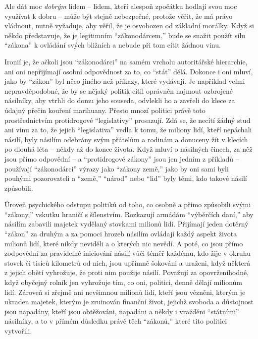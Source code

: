 \documentclass{book}
\begin{document}
Ale dát moc \emph{dobrým} lidem -- lidem, kteří alespoň zpočátku hodlají svou moc využívat k dobru -- může být stejně nebezpečné, protože věřit, že má právo vládnout, nutně vyžaduje, aby věřil, že je osvobozen od základní morálky. Když si někdo představuje, že je legitimním \enquote{zákonodárcem,} bude se snažit použít sílu \enquote{zákona} k ovládání svých bližních a nebude při tom cítit žádnou vinu.

Ironií je, že ačkoli jsou \enquote{zákonodárci} na samém vrcholu autoritářské hierarchie, ani oni nepřijímají osobní odpovědnost za to, co \enquote{stát} dělá. Dokonce i oni mluví, jako by \enquote{zákon} byl něco jiného než příkazy, které vydávají. Je například velmi nepravděpodobné, že by se nějaký politik cítil oprávněn najmout ozbrojené násilníky, aby vtrhli do domu jeho souseda, odvlekli ho a zavřeli do klece za údajný přečin kouření marihuany. Přesto mnozí politici právě toto prostřednictvím protidrogové \enquote{legislativy} prosazují. Zdá se, že necítí žádný stud ani vinu za to, že jejich \enquote{legislativa} vedla k tomu, že miliony lidí, kteří nepáchali násilí, byly násilím odebrány svým přátelům a rodinám a donuceny žít v klecích po dlouhá léta -- někdy až do konce života. Když mluví o násilných činech, za něž jsou přímo odpovědní -- a \enquote{protidrogové zákony} jsou jen jedním z příkladů -- používají \enquote{zákonodárci} výrazy jako \enquote{zákony země,} jako by oni sami byli pouhými pozorovateli a \enquote{země,} \enquote{národ} nebo \enquote{lid} byly těmi, kdo takové násilí způsobili.

Úroveň psychického odstupu politiků od toho, co osobně a přímo způsobili svými \enquote{zákony,} vskutku hraničí s šílenstvím. Rozkazují armádám \enquote{výběrčích daní,} aby násilím zabavili majetek vydělaný stovkami milionů lidí. Přijímají jeden dotěrný \enquote{zákon} za druhým a za pomoci hrozeb násilím ovládají každý aspekt života milionů lidí, které nikdy neviděli a o kterých nic nevědí. A poté, co jsou přímo zodpovědní za pravidelné iniciování násilí vůči téměř každému, kdo žije v okruhu stovek či tisíců kilometrů od nich, jsou upřímně šokováni a uraženi, když některá z jejich obětí vyhrožuje, že proti nim použije násilí. Považují za opovrženíhodné, když obyčejný rolník jen vyhrožuje tím, co oni, politici, denně dělají milionům lidí. Zároveň si zřejmě ani nevšimnou milionů lidí, kteří jsou vězněni, kterým je ukraden majetek, kterým je zruinován finanční život, jejichž svoboda a důstojnost jsou napadány, kteří jsou obtěžováni, napadáni a někdy i vražděni \enquote{státními} násilníky, a to v přímém důsledku právě těch \enquote{zákonů,} které tito politici vytvořili.
\end{document}
